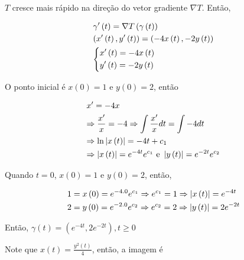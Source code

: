 \documentclass[11pt, oneside, a4paper]{gsm-l}
\begin{document}
\begin{enumerate}
\begin{sol}
$T$ cresce mais rápido na dire\c{c}ão do vetor gradiente $\nabla T$. Então,

\[
\begin{gathered}
  \gamma '\left( t \right) = \nabla T\left( {\gamma \left( t \right)} \right) \hfill \\
  \left( {x'\left( t \right),y'\left( t \right)} \right) = \left( { - 4x\left( t \right), - 2y\left( t \right)} \right) \hfill \\
  \left\{ \begin{gathered}
  x'\left( t \right) =  - 4x\left( t \right) \hfill \\
  y'\left( t \right) =  - 2y\left( t \right) \hfill \\
\end{gathered}  \right. \hfill \\
\end{gathered}
\]

O ponto inicial é $x(0)=1$ e $y(0)=2$, então

\[
\begin{gathered}
  x' =  - 4x \hfill \\
   \Rightarrow \frac{{x'}}
{x} =  - 4 \Rightarrow \int {\frac{{x'}}
{x}dt = \int { - 4dt} }  \hfill \\
   \Rightarrow \ln \left| {x\left( t \right)} \right| =  - 4t + c_1  \hfill \\
   \Rightarrow \left| {x\left( t \right)} \right| = e^{ - 4t} e^{c_1 } {\text{ e }}\left| {y\left( t \right)} \right| = e^{ - 2t} e^{c_2 }  \hfill \\
\end{gathered}
\]

Quando $t=0$, $x(0)=1$ e $y(0)=2$, então,

\[
\begin{gathered}
  1 = x\left( 0 \right) = e^{ - 4.0} e^{c_1 }  \Rightarrow e^{c_1 }  = 1 \Rightarrow \left| {x\left( t \right)} \right| = e^{ - 4t}  \hfill \\
  2 = y\left( 0 \right) = e^{ - 2.0} e^{c_2 }  \Rightarrow e^{c_2 }  = 2 \Rightarrow \left| {y\left( t \right)} \right| = 2e^{ - 2t}  \hfill \\
\end{gathered}
\]

Então, $\gamma \left( t \right) = \left( {e^{ - 4t} ,2e^{ - 2t} } \right),t \geqslant 0$

Note que $x\left( t \right) = \frac{{y^2 \left( t \right)}}{4}$, então, a imagem é


\end{sol}

\end{enumerate}
\end{document}
